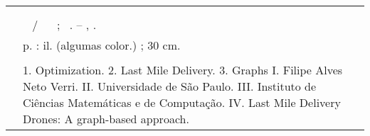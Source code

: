 %
\begin{fichacatalografica}
	\hspace{-1.4cm}
	\vspace*{\fill}					%
\begin{center}					%
  \imprimirnotabib \\
  \begin{table}[htb]
	\scriptsize
	\centering	
	\begin{tabular}{|p{0.9cm} p{8.7cm}|}
		\hline
	      & \\
		  &	  \imprimirautorficha     \\
		
		 \imprimircutter & 
							\hspace{0.4cm}\imprimirtitulo~  / ~\imprimirautor~ ;  ~\imprimirorientadorcorpoficha. -- 	\imprimirlocal, \imprimirdata.   \\
		
		  &  %
		
			\hspace{0.4cm}\pageref{LastPage} p. : il. (algumas color.) ; 30 cm.\\ 
		  & \\ 
		  & \hspace{0.4cm}1. Optimization. 2. Last Mile Delivery. 3. Graphs I. Filipe Alves Neto Verri. II. Universidade de São Paulo. III. Instituto de Ciências Matemáticas e de Computação. IV. Last Mile Delivery Drones: A graph-based approach. \\
		  \hline
	\end{tabular}
  \end{table}
\end{center}
\end{fichacatalografica}

